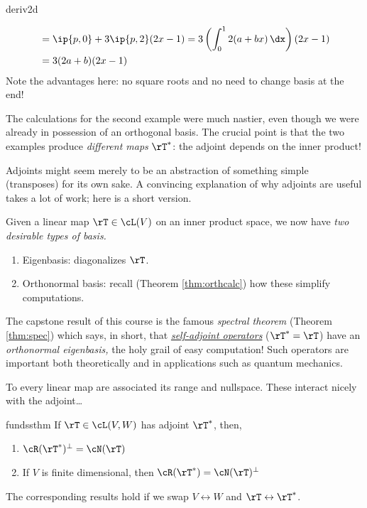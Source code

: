 \begin{examples}{}{deriv2d}
\begin{enumerate}
\begin{enumerate}
\begin{align*}
		&=\ip{p,0} +3\ip{p,2}(2x-1) =3\left(\int_0^12(a+bx)\,\dx\right)(2x-1) \\
		&=3(2a+b)(2x-1)
		\end{align*}
		Note the advantages here: no square roots and no need to change basis at the end!
  \end{enumerate}
\end{enumerate}
  The calculations for the second example were much nastier, even though we were already in possession of an orthogonal basis. The crucial point is that the two examples produce \emph{different maps} $\rT^*$: the adjoint depends on the inner product! 
\end{examples}





Adjoints might seem merely to be an abstraction of something simple (transposes) for its own sake. A convincing explanation of why adjoints are useful takes a lot of work; here is a short version.\smallbreak

Given a linear map $\rT\in\cL(V)$ on an inner product space, we now have \emph{two desirable types of basis.}
\begin{enumerate}
  \item Eigenbasis: diagonalizes $\rT$.
  \item Orthonormal basis: recall (Theorem \ref{thm:orthcalc}) how these simplify computations.
\end{enumerate}
The capstone result of this course is the famous \emph{spectral theorem} (Theorem \ref{thm:spec}) which says, in short, that \emph{\href{https://en.wikipedia.org/wiki/self-adjoint_operator}{self-adjoint operators}} ($\rT^*=\rT$) have an \emph{orthonormal eigenbasis,} the holy grail of easy computation! Such operators are important both theoretically and in applications such as quantum mechanics.
\goodbreak




To every linear map are associated its range and nullspace. These interact nicely with the adjoint\ldots

\begin{thm}{}{fundssthm}
If $\rT\in\cL(V,W)$ has adjoint $\rT^*$, then,
  \begin{enumerate}
    \item $\cR(\rT^*)^\perp=\cN(\rT)$
    \item If $V$ is finite dimensional, then $\cR(\rT^*)=\cN(\rT)^\perp$
  \end{enumerate}
  The corresponding results hold if we swap $V\leftrightarrow W$ and $\rT\leftrightarrow \rT^*$.
\end{thm}

